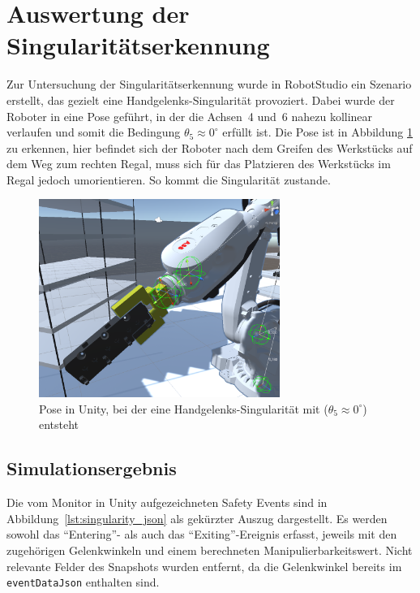 \newpage
\section{Auswertung der Singularitätserkennung}
\label{sec:singularityauswertung}

Zur Untersuchung der Singularitätserkennung wurde in RobotStudio ein
Szenario erstellt,
das gezielt eine Handgelenks-Singularität provoziert. Dabei wurde der
Roboter in eine Pose
geführt, in der die Achsen~4 und~6 nahezu kollinear verlaufen und
somit die Bedingung
$\theta_{5} \approx 0^\circ$ erfüllt ist. Die Pose ist in Abbildung
\ref{fig:wristSingularity} zu erkennen, hier befindet sich der Roboter nach dem
Greifen des Werkstücks auf dem Weg zum rechten Regal, muss sich für das
Platzieren des Werkstücks im Regal jedoch umorientieren. So kommt die
Singularität
zustande.

\begin{figure}[H]
  \centering
  \includegraphics[width=0.7\textwidth]{figures/wristSingularity.png}
  \caption{Pose in Unity, bei der eine Handgelenks-Singularität mit
  ($\theta_{5} \approx 0^\circ$) entsteht}
  \label{fig:wristSingularity}
\end{figure}

\subsection{Simulationsergebnis}

Die vom Monitor in Unity aufgezeichneten Safety Events sind in
Abbildung~\ref{lst:singularity_json} als gekürzter Auszug
dargestellt. Es werden sowohl
das \enquote{Entering}- als auch das \enquote{Exiting}-Ereignis
erfasst, jeweils mit den
zugehörigen Gelenkwinkeln und einem berechneten
Manipulierbarkeitswert. Nicht relevante
Felder des Snapshots wurden entfernt, da die Gelenkwinkel bereits im
\texttt{eventDataJson} enthalten sind.

